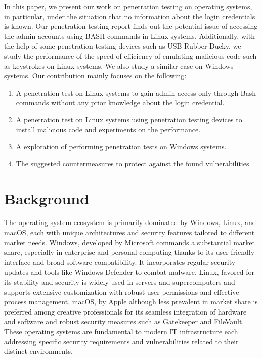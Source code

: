 \documentclass[manuscript,acmsmall,anonymous,review,screen,nonacm=true, authorversion=true]{acmart}
\begin{document}
In this paper, we present our work on penetration testing on operating systems, in particular, under the situation that no information about the login credentials is known. Our penetration testing report finds out the potential issue of accessing the admin accounts using BASH commands in Linux systems. Additionally, with the help of some penetration testing devices such as USB Rubber Ducky, we study the performance of the speed of efficiency of emulating malicious code such as keystrokes on Linux systems. We also study a similar case on Windows systems. 
Our contribution mainly focuses on the following:
\begin{enumerate}
    \item A penetration test on Linux systems to gain admin access only through Bash commands without any prior knowledge about the login credential.
    \item A penetration test on Linux systems using penetration testing devices to install malicious code and experiments on the performance.
    \item A exploration of performing penetration tests on Windows systems.
    \item The suggested countermeasures to protect against the found vulnerabilities.
\end{enumerate}

\section{Background}
The operating system ecosystem is primarily dominated by Windows, Linux, and macOS, each with unique architectures and security features tailored to different market needs. Windows, developed by Microsoft commands a substantial market share, especially in enterprise and personal computing thanks to its user-friendly interface and broad software compatibility. It incorporates regular security updates and tools like Windows Defender to combat malware. Linux, favored for its stability and security is widely used in servers and supercomputers and supports extensive customization with robust user permissions and effective process management. macOS, by Apple although less prevalent in market share is preferred among creative professionals for its seamless integration of hardware and software and robust security measures such as Gatekeeper and FileVault. These operating systems are fundamental to modern IT infrastructure each addressing specific security requirements and vulnerabilities related to their distinct environments.
\end{document}
